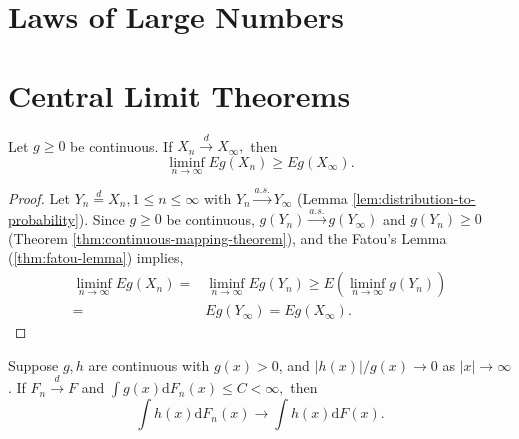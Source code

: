 \section{Laws of Large Numbers}

\section{Central Limit Theorems}

\begin{exercise}
	Let $g\geq 0$ be continuous. If $X_{n}\stackrel{d}{\rightarrow}X_{\infty},$ then
	\begin{equation*}
		\liminf_{n\rightarrow\infty}Eg\left(X_{n}\right)\geq Eg\left(X_{\infty}\right).
	\end{equation*}
	\label{ex:fatou-lemma-distribution}
\end{exercise}

\begin{proof}
	Let $Y_n\stackrel{d}{=}X_n,1\leq n\leq\infty$ with $Y_n\stackrel{a.s.}{\rightarrow}Y_\infty$ (Lemma \ref{lem:distribution-to-probability}).
	Since $g\geq 0$ be continuous, $g(Y_n)\stackrel{a.s.}{\rightarrow}g(Y_\infty)$ and $g(Y_n)\geq 0$ (Theorem \ref{thm:continuous-mapping-theorem}), and the Fatou's Lemma (\ref{thm:fatou-lemma}) implies,
	\begin{equation*}
		\begin{aligned}
			\liminf_{n\rightarrow\infty}Eg(X_n)= & \liminf_{n\rightarrow\infty}Eg(Y_n)\geq E\left(\liminf_{n\rightarrow\infty}g(Y_n)\right) \\
			=                                    & Eg(Y_\infty)=Eg(X_\infty).
		\end{aligned}
	\end{equation*}
\end{proof}

\begin{exercise}
	Suppose $g,h$ are continuous with $g(x)>0$, and $|h(x)|/g(x)\rightarrow 0$ as $|x|\rightarrow\infty$. If $F_{n}\stackrel{d}{\rightarrow}F$ and $\int g(x)\mathrm{d}F_{n}(x)\leq C<\infty,$ then
	\begin{equation*}
		\int h(x)\mathrm{d}F_{n}(x) \rightarrow \int h(x)\mathrm{d}F(x).
	\end{equation*}
\end{exercise}

